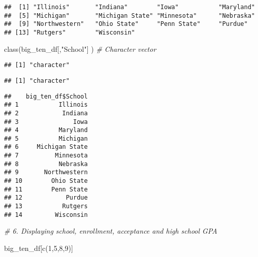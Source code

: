 \documentclass[
]{article}
\newenvironment{Shaded}{\begin{snugshade}}{\end{snugshade}}
\newcommand{\CommentTok}[1]{\textcolor[rgb]{0.56,0.35,0.01}{\textit{#1}}}
\newcommand{\DecValTok}[1]{\textcolor[rgb]{0.00,0.00,0.81}{#1}}
\newcommand{\FunctionTok}[1]{\textcolor[rgb]{0.00,0.00,0.00}{#1}}
\newcommand{\NormalTok}[1]{#1}
\newcommand{\OtherTok}[1]{\textcolor[rgb]{0.56,0.35,0.01}{#1}}
\newcommand{\SpecialCharTok}[1]{\textcolor[rgb]{0.00,0.00,0.00}{#1}}
\newcommand{\StringTok}[1]{\textcolor[rgb]{0.31,0.60,0.02}{#1}}
\begin{document}
\begin{verbatim}
##  [1] "Illinois"       "Indiana"        "Iowa"           "Maryland"      
##  [5] "Michigan"       "Michigan State" "Minnesota"      "Nebraska"      
##  [9] "Northwestern"   "Ohio State"     "Penn State"     "Purdue"        
## [13] "Rutgers"        "Wisconsin"
\end{verbatim}

\begin{Shaded}
\begin{Highlighting}[]
\FunctionTok{class}\NormalTok{(big\_ten\_df[,}\StringTok{"School"}\NormalTok{] )              }\CommentTok{\# Character vector}
\end{Highlighting}
\end{Shaded}

\begin{verbatim}
## [1] "character"
\end{verbatim}

\begin{Shaded}
\end{Shaded}

\begin{verbatim}
## [1] "character"
\end{verbatim}

\begin{Shaded}
\end{Shaded}

\begin{verbatim}
##    big_ten_df$School
## 1           Illinois
## 2            Indiana
## 3               Iowa
## 4           Maryland
## 5           Michigan
## 6     Michigan State
## 7          Minnesota
## 8           Nebraska
## 9       Northwestern
## 10        Ohio State
## 11        Penn State
## 12            Purdue
## 13           Rutgers
## 14         Wisconsin
\end{verbatim}

\begin{Shaded}
\begin{Highlighting}[]
\CommentTok{\# 6. Displaying school, enrollment, acceptance and high school GPA}

\NormalTok{big\_ten\_df[}\FunctionTok{c}\NormalTok{(}\DecValTok{1}\NormalTok{,}\DecValTok{5}\NormalTok{,}\DecValTok{8}\NormalTok{,}\DecValTok{9}\NormalTok{)]}
\end{Highlighting}
\end{Shaded}
\end{document}
